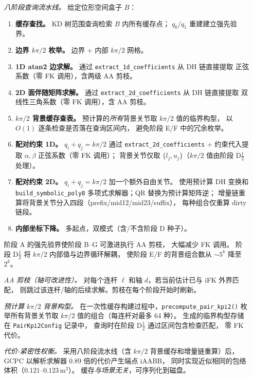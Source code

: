 \documentclass[journal]{IEEEtran}
\begin{document}
\emph{八阶段查询流水线。}
给定位形空间盒子 $B$：
\begin{enumerate}
  \item[\textbf{A.}] \textbf{缓存查找。}
    KD 树范围查询检索 $B$ 内所有缓存点；
    $q_0/q_1$ 重建建立强先验界。
  \item[\textbf{B.}] \textbf{边界 $k\pi/2$ 枚举。}
    边界 + 内部 $k\pi/2$ 网格。
  \item[\textbf{C.}] \textbf{1D atan2 边求解。}
    通过 \texttt{extract\_1d\_coefficients} 从 DH 链直接提取
    正弦系数（零 FK 调用），含两级 AA 剪枝。
  \item[\textbf{D.}] \textbf{2D 面伴随矩阵求解。}
    通过 \texttt{extract\_2d\_coefficients} 从 DH 链直接提取
    双线性三角系数（零 FK 调用），含 AA 剪枝。
  \item[\textbf{D$\tfrac{1}{2}$.}] \textbf{$k\pi/2$ 背景缓存查表。}
    预计算的\emph{所有}背景关节取 $k\pi/2$ 值的临界构型，
    以 $O(1)$ 逐条检查是否落在查询区间内，
    避免阶段 E/F 中的冗余枚举。
  \item[\textbf{E.}] \textbf{配对约束 1D。}
    $q_i + q_j = k\pi/2$ 通过 \texttt{extract\_2d\_coefficients}
    + 约束代入提取 $\alpha,\beta$ 正弦系数（零 FK 调用）；
    背景关节仅取 $\{l_j, u_j\}$（$k\pi/2$ 值由阶段 D$\tfrac{1}{2}$ 处理）。
  \item[\textbf{F.}] \textbf{配对约束 2D。}
    $q_i + q_j = k\pi/2$ 加一个额外自由关节。
    使用预计算 DH 变换和 \texttt{build\_symbolic\_poly8}
    多项式求解器；QR 替换为预计算矩阵逆；
    增量链重算将背景关节分入四段（prefix/mid12/mid23/suffix），
    每种组合仅重算 dirty 链段。
  \item[\textbf{G.}] \textbf{内部坐标下降。}
    多起点，双模式（含/不含阶段 D 种子）。
\end{enumerate}
阶段 A 的强先验界使阶段 B--G 可激进执行 AA 剪枝，
大幅减少 FK 调用。
阶段 D$\tfrac{1}{2}$ 将 $k\pi/2$ 内部值与边界循环解耦，
使阶段 E/F 的背景组合数从 $\sim\!5^k$ 降至 $2^k$。

\emph{AA 剪枝（轴可改进性）。}
对每个连杆 $\ell$ 和轴 $d$，若当前估计已与 iFK 外界匹配，
则跳过该连杆/轴的后续求解。剪枝在每个阶段开始时刷新。

\emph{预计算 $k\pi/2$ 背景构型。}
在一次性缓存构建过程中，\texttt{precompute\_pair\_kpi2()}
枚举所有背景关节取 $k\pi/2$ 值的组合（每连杆对最多 64 种）。
生成的临界构型存储在 \texttt{PairKpi2Config} 记录中，
查询时在阶段 D$\tfrac{1}{2}$ 通过区间包含检查匹配，
零 FK 代价。

\emph{代价-紧密性权衡。}
采用八阶段流水线（含 $k\pi/2$ 背景缓存和增量链重算）后，
GCPC 以解析求解器 $0.89$ 倍的代价产生端点 iAABB，
同时实现近似相同的包络体积（$0.121$--$0.123$\,m$^3$）。
缓存\emph{与场景无关}，可序列化到磁盘。
\end{document}
